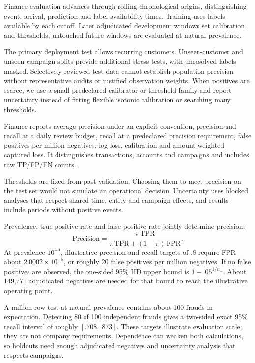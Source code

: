 \documentclass[11pt]{article}
\begin{document}
Finance evaluation advances through rolling chronological origins, distinguishing event, arrival, prediction and label-availability times. Training uses labels available by each cutoff. Later adjudicated development windows set calibration and thresholds; untouched future windows are evaluated at natural prevalence.

The primary deployment test allows recurring customers. Unseen-customer and unseen-campaign splits provide additional stress tests, with unresolved labels masked. Selectively reviewed test data cannot establish population precision without representative audits or justified observation weights. When positives are scarce, we use a small predeclared calibrator or threshold family and report uncertainty instead of fitting flexible isotonic calibration or searching many thresholds.

Finance reports average precision under an explicit convention, precision and recall at a daily review budget, recall at a predeclared precision requirement, false positives per million negatives, log loss, calibration and amount-weighted captured loss. It distinguishes transactions, accounts and campaigns and includes raw TP/FP/FN counts.

Thresholds are fixed from past validation. Choosing them to meet precision on the test set would not simulate an operational decision. Uncertainty uses blocked analyses that respect shared time, entity and campaign effects, and results include periods without positive events.

Prevalence, true-positive rate and false-positive rate jointly determine precision:
\[
\mathrm{Precision}=\frac{\pi\,\mathrm{TPR}}{\pi\,\mathrm{TPR}+(1-\pi)\,\mathrm{FPR}}.
\]
At prevalence $10^{-4}$, illustrative precision and recall targets of $.8$ require FPR about $2.0002\times10^{-5}$, or roughly 20 false positives per million negatives. If no false positives are observed, the one-sided 95\% IID upper bound is $1-.05^{1/n_-}$. About 149,771 adjudicated negatives are needed for that bound to reach the illustrative operating point.

A million-row test at natural prevalence contains about 100 frauds in expectation. Detecting 80 of 100 independent frauds gives a two-sided exact 95\% recall interval of roughly $[.708,.873]$. These targets illustrate evaluation scale; they are not company requirements. Dependence can weaken both calculations, so holdouts need enough adjudicated negatives and uncertainty analysis that respects campaigns.
\end{document}
